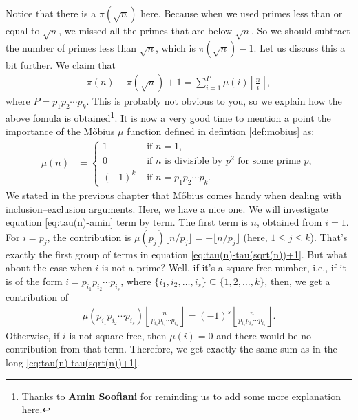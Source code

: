\documentclass{subfiles}
\begin{document}
	Notice that there is a $\pi(\sqrt{n})$ here. Because when we used primes less than or equal to $\sqrt{n}$, we missed all the primes that are below $\sqrt{n}$. So we should subtract the number of primes less than $\sqrt{n}$, which is $\pi(\sqrt{n})-1$. Let us discuss this a bit further. We claim that
	\begin{align}
		\pi(n) -\pi(\sqrt{n})+1 = \sum_{i=1}^{P}\mu(i)\left\lfloor\frac{n}{i}\right\rfloor, \label{eq:tau(n)-amin}
	\end{align}
	where $P=p_1p_2\cdots p_k$. This is probably not obvious to you, so we explain how the above fomula is obtained\footnote{Thanks to \textbf{Amin Soofiani} for reminding us to add some more explanation here.}. It is now a very good time to mention a point the importance of the M\H obius $\mu$ function defined in defintion \eqref{def:mobius} as:
	\begin{align*}
		\mu(n) & = 
		\begin{cases}
			1&\mbox{ if }n=1,\\
			0&\mbox{ if }n
			\mbox{ is divisible by }p^2
			\mbox{ for some prime }p,\\
			(-1)^k&\mbox{ if }n=p_1p_2\cdots p_k.
		\end{cases}
	\end{align*}
	We stated in the previous chapter that M\H obius comes handy when dealing with inclusion--exclusion arguments. Here, we have a nice one. We will investigate equation \eqref{eq:tau(n)-amin} term by term. The first term is $n$, obtained from $i=1$. For $i=p_j$, the contribution is $\mu(p_j)\lfloor n/p_j \rfloor=-\lfloor n/p_j \rfloor$ (here, $1 \leq j \leq k$). That's exactly the first group of terms in equation \eqref{eq:tau(n)-tau(sqrt(n))+1}. But what about the case when $i$ is not a prime? Well, if it's a square-free number, i.e., if it is of the form $i=p_{i_1}p_{i_2}\cdots p_{i_s}$, where $\{i_1, i_2, \ldots, i_s\} \subseteq \{1,2,\ldots,k\}$, then, we get a contribution of
	\begin{align*}
		\mu(p_{i_1}p_{i_2}\cdots p_{i_s}) \left\lfloor\frac{n}{p_{i_1}p_{i_2}\cdots p_{i_s}}\right\rfloor = (-1)^s\left\lfloor\frac{n}{p_{i_1}p_{i_2}\cdots p_{i_s}}\right\rfloor.
	\end{align*}
	Otherwise, if $i$ is not square-free, then $\mu(i)=0$ and there would be no contribution from that term. Therefore, we get exactly the same sum as in the long \eqref{eq:tau(n)-tau(sqrt(n))+1}. 
	
	
	
\end{document}
